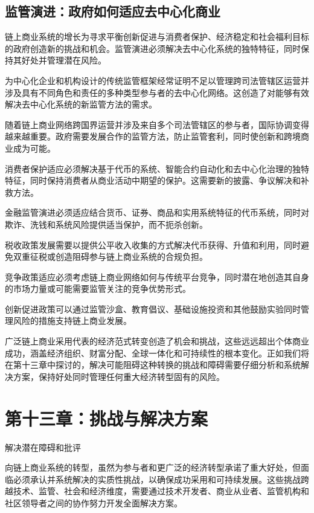 \documentclass[
  Letterpaper,
]{scrbook}
\begin{document}
\section{监管演进：政府如何适应去中心化商业}\label{ux76d1ux7ba1ux6f14ux8fdbux653fux5e9cux5982ux4f55ux9002ux5e94ux53bbux4e2dux5fc3ux5316ux5546ux4e1a}

链上商业系统的增长为寻求平衡创新促进与消费者保护、经济稳定和社会福利目标的政府创造新的挑战和机会。监管演进必须解决去中心化系统的独特特征，同时保持其好处并管理潜在风险。

为中心化企业和机构设计的传统监管框架经常证明不足以管理跨司法管辖区运营并涉及具有不同角色和责任的多种类型参与者的去中心化网络。这创造了对能够有效解决去中心化系统的新监管方法的需求。

随着链上商业网络跨国界运营并涉及来自多个司法管辖区的参与者，国际协调变得越来越重要。政府需要发展合作的监管方法，防止监管套利，同时使创新和跨境商业成为可能。

消费者保护适应必须解决基于代币的系统、智能合约自动化和去中心化治理的独特特征，同时保持消费者从商业活动中期望的保护。这需要新的披露、争议解决和补救方法。

金融监管演进必须适应结合货币、证券、商品和实用系统特征的代币系统，同时对欺诈、洗钱和系统风险提供适当保护，而不扼杀创新。

税收政策发展需要以提供公平收入收集的方式解决代币获得、升值和利用，同时避免双重征税或创造阻碍参与链上商业系统的合规负担。

竞争政策适应必须考虑链上商业网络如何与传统平台竞争，同时潜在地创造其自身的市场力量或可能需要监管关注的竞争优势形式。

创新促进政策可以通过监管沙盒、教育倡议、基础设施投资和其他鼓励实验同时管理风险的措施支持链上商业发展。

广泛链上商业采用代表的经济范式转变创造了机会和挑战，这些远远超出个体商业成功，涵盖经济组织、财富分配、全球一体化和可持续性的根本变化。正如我们将在第十三章中探讨的，解决可能阻碍这种转换的挑战和障碍需要仔细分析和系统解决方案，保持好处同时管理任何重大经济转型固有的风险。

\chapter{第十三章：挑战与解决方案}\label{sec-challenges-solutions}

解决潜在障碍和批评

向链上商业系统的转型，虽然为参与者和更广泛的经济转型承诺了重大好处，但面临必须承认并系统解决的实质性挑战，以确保成功采用和可持续发展。这些挑战跨越技术、监管、社会和经济维度，需要通过技术开发者、商业从业者、监管机构和社区领导者之间的协作努力开发全面解决方案。
\end{document}
